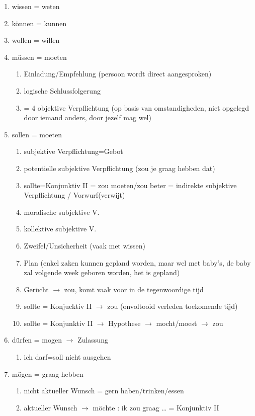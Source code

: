\documentclass[main.tex]{subfiles}
\begin{document}
\begin{enumerate}[label=\Alph*]
\item wissen = weten
\item können = kunnen
\item wollen = willen
\item müssen = moeten
	\begin{enumerate}
	\item Einladung/Empfehlung (persoon wordt direct aangesproken)
	\item logische Schlussfolgerung
	\item = 4 objektive Verpflichtung (op basis van omstandigheden, niet opgelegd door iemand anders, door jezelf mag wel)	
	\end{enumerate}
\item sollen = moeten
	\begin{enumerate}
	\item subjektive Verpflichtung=Gebot
	\item potentielle subjektive Verpflichtung (zou je graag hebben dat)
	\item sollte=Konjunktiv II = zou moeten/zou beter
 	 = indirekte subjektive Verpflichtung / Vorwurf(verwijt)
 	 \item moralische subjektive V.
 	 \item kollektive subjektive V.
 	 \item Zweifel/Unsicherheit (vaak met wissen)
 	 \item Plan (enkel zaken kunnen gepland worden, maar wel met baby's, de baby zal volgende week geboren worden, het is gepland)
	 \item Gerücht $\rightarrow$ zou, komt vaak voor in de tegenwoordige tijd
	 \item sollte = Konjucktiv II $\rightarrow$ zou (onvoltooid verleden toekomende tijd)
	 \item sollte = Konjunktiv II $\rightarrow$ Hypothese
	$\rightarrow$ mocht/moest 	
	$\rightarrow$ zou 
	\end{enumerate}
\item dürfen = mogen $\rightarrow$ Zulassung
	\begin{enumerate}
	\item ich darf=soll nicht ausgehen
	\end{enumerate}
\item mögen = graag hebben
	\begin{enumerate}
	\item nicht aktueller Wunsch = gern haben/trinken/essen
	\item aktueller Wunsch $\rightarrow$ möchte : ik zou graag … = Konjunktiv II
	\end{enumerate}
\end{enumerate}
\end{document}
